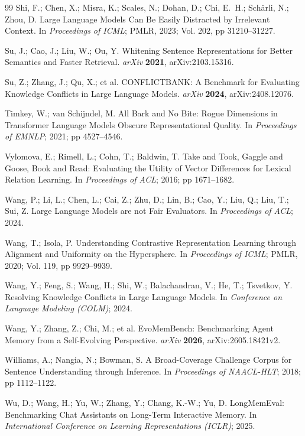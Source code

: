 \documentclass[journal=jcisd8,manuscript=article]{achemso}
\begin{document}
\begin{thebibliography}{99}
 Shi, F.; Chen, X.; Misra, K.; Scales, N.; Dohan, D.; Chi, E.~H.; Sch\"arli, N.; Zhou, D. Large Language Models Can Be Easily Distracted by Irrelevant Context. In \emph{Proceedings of ICML}; PMLR, 2023; Vol. 202, pp 31210--31227.

 Su, J.; Cao, J.; Liu, W.; Ou, Y. Whitening Sentence Representations for Better Semantics and Faster Retrieval. \emph{arXiv} \textbf{2021}, arXiv:2103.15316.

 Su, Z.; Zhang, J.; Qu, X.; et al. CONFLICTBANK: A Benchmark for Evaluating Knowledge Conflicts in Large Language Models. \emph{arXiv} \textbf{2024}, arXiv:2408.12076.

 Timkey, W.; van Schijndel, M. All Bark and No Bite: Rogue Dimensions in Transformer Language Models Obscure Representational Quality. In \emph{Proceedings of EMNLP}; 2021; pp 4527--4546.

 Vylomova, E.; Rimell, L.; Cohn, T.; Baldwin, T. Take and Took, Gaggle and Goose, Book and Read: Evaluating the Utility of Vector Differences for Lexical Relation Learning. In \emph{Proceedings of ACL}; 2016; pp 1671--1682.

 Wang, P.; Li, L.; Chen, L.; Cai, Z.; Zhu, D.; Lin, B.; Cao, Y.; Liu, Q.; Liu, T.; Sui, Z. Large Language Models are not Fair Evaluators. In \emph{Proceedings of ACL}; 2024.

 Wang, T.; Isola, P. Understanding Contrastive Representation Learning through Alignment and Uniformity on the Hypersphere. In \emph{Proceedings of ICML}; PMLR, 2020; Vol. 119, pp 9929--9939.

 Wang, Y.; Feng, S.; Wang, H.; Shi, W.; Balachandran, V.; He, T.; Tsvetkov, Y. Resolving Knowledge Conflicts in Large Language Models. In \emph{Conference on Language Modeling (COLM)}; 2024.

 Wang, Y.; Zhang, Z.; Chi, M.; et al. EvoMemBench: Benchmarking Agent Memory from a Self-Evolving Perspective. \emph{arXiv} \textbf{2026}, arXiv:2605.18421v2.

 Williams, A.; Nangia, N.; Bowman, S. A Broad-Coverage Challenge Corpus for Sentence Understanding through Inference. In \emph{Proceedings of NAACL-HLT}; 2018; pp 1112--1122.

 Wu, D.; Wang, H.; Yu, W.; Zhang, Y.; Chang, K.-W.; Yu, D. LongMemEval: Benchmarking Chat Assistants on Long-Term Interactive Memory. In \emph{International Conference on Learning Representations (ICLR)}; 2025.


\end{thebibliography}
\end{document}
